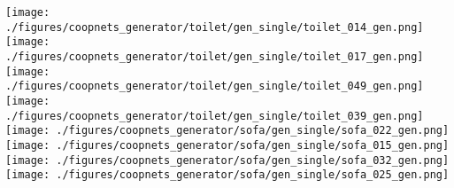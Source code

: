 \documentclass[10pt,twocolumn,letterpaper]{article}
\begin{document}
\begin{figure*}
\centering
\begin{minipage}[b]{.34\textwidth}
  \centering
     \hspace{-1mm}
     \texttt{[image: ./figures/coopnets\_generator/toilet/gen\_single/toilet\_014\_gen.png]}\hspace{-2mm} 
     \texttt{[image: ./figures/coopnets\_generator/toilet/gen\_single/toilet\_017\_gen.png]}\hspace{-2mm} 
     \texttt{[image: ./figures/coopnets\_generator/toilet/gen\_single/toilet\_049\_gen.png]}\hspace{-2mm} 
     \texttt{[image: ./figures/coopnets\_generator/toilet/gen\_single/toilet\_039\_gen.png]}\hspace{-2mm}  \\	
	\texttt{[image: ./figures/coopnets\_generator/sofa/gen\_single/sofa\_022\_gen.png]}\hspace{-0.8mm}
	\texttt{[image: ./figures/coopnets\_generator/sofa/gen\_single/sofa\_015\_gen.png]}\hspace{-0.8mm}
	\texttt{[image: ./figures/coopnets\_generator/sofa/gen\_single/sofa\_032\_gen.png]}\hspace{-0.8mm}
	\texttt{[image: ./figures/coopnets\_generator/sofa/gen\_single/sofa\_025\_gen.png]}\hspace{-0.8mm}
	

\end{minipage}
\end{figure*}
\end{document}
